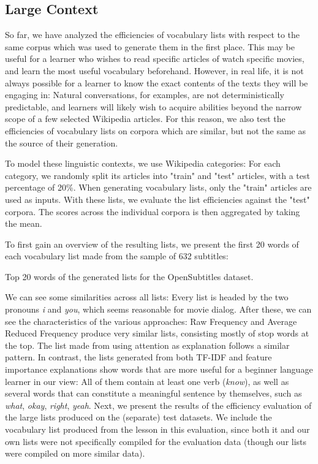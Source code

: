 \subsection{Large Context} \label{sec:results-large-context}
So far, we have analyzed the efficiencies of vocabulary lists with respect to the same corpus which was used to generate them in the first place.
This may be useful for a learner who wishes to read specific articles of watch specific movies, and learn the most useful vocabulary beforehand.
However, in real life, it is not always possible for a learner to know the exact contents of the texts they will be engaging in:
Natural conversations, for examples, are not deterministically predictable, and learners will likely wish to acquire abilities beyond the narrow scope of a few selected Wikipedia articles.
For this reason, we also test the efficiencies of vocabulary lists on corpora which are similar, but not the same as the source of their generation.

To model these linguistic contexts, we use Wikipedia categories:
For each category, we randomly split its articles into "train" and "test" articles, with a test percentage of 20\%.
When generating vocabulary lists, only the "train" articles are used as inputs.
With these lists, we evaluate the list efficiencies against the "test" corpora.
The scores across the individual corpora is then aggregated by taking the mean.

To first gain an overview of the resulting lists, we present the first 20 words of each vocabulary list made from the sample of 632 subtitles:

\begin{table}[H]
	\centering
	
	\caption{Top 20 words of the generated lists for the OpenSubtitles dataset.}
	\label{tbl:first-k-words-opensubs}
\end{table}

We can see some similarities across all lists:
Every list is headed by the two pronouns \textit{i} and \textit{you}, which seems reasonable for movie dialog.
After these, we can see the characteristics of the various approaches:
Raw Frequency and Average Reduced Frequency produce very similar lists, consisting mostly of stop words at the top.
The list made from using attention as explanation follows a similar pattern.
In contrast, the lists generated from both TF-IDF and feature importance explanations show words that are more useful for a beginner language learner in our view:
All of them contain at least one verb (\textit{know}), as well as several words that can constitute a meaningful sentence by themselves, such as \textit{what}, \textit{okay}, \textit{right}, \textit{yeah}.
Next, we present the results of the efficiency evaluation of the large lists produced on the (separate) test datasets.
We include the vocabulary list produced from the \Rosetta lesson in this evaluation, since both it and our own lists were not specifically compiled for the evaluation data (though our lists were compiled on more similar data).


